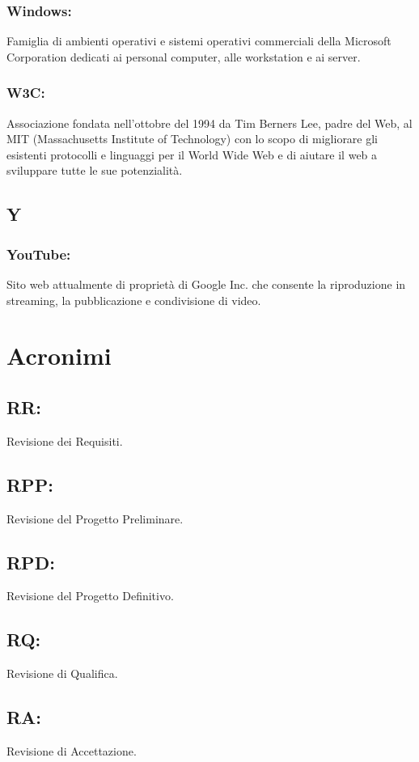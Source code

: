 \subsubsection*{Windows:} Famiglia di ambienti operativi e sistemi operativi
commerciali della Microsoft Corporation dedicati ai personal computer, alle workstation e ai server.

\subsubsection*{W3C:} Associazione fondata nell'ottobre del 1994 da Tim Berners
Lee, padre del Web, al MIT (Massachusetts Institute of Technology) con lo scopo di migliorare
gli esistenti protocolli e linguaggi per il World Wide Web e di aiutare il web a
sviluppare tutte le sue potenzialit\`a.


\subsection*{\huge{Y}}
\subsubsection*{YouTube:} Sito web attualmente di propriet\`a di Google Inc. che
consente la riproduzione in streaming, la pubblicazione e condivisione di video.


\vspace{1cm}
\section*{Acronimi}

\subsection*{RR:} Revisione dei Requisiti.

\subsection*{RPP:} Revisione del Progetto Preliminare.

\subsection*{RPD:} Revisione del Progetto Definitivo.

\subsection*{RQ:} Revisione di Qualifica.

\subsection*{RA:} Revisione di Accettazione.




